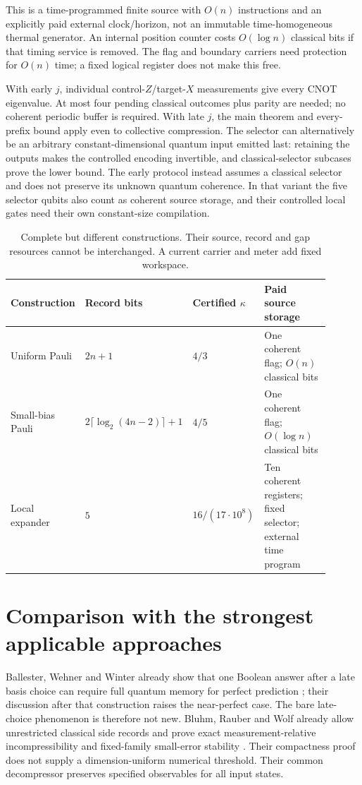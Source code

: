 \documentclass[11pt]{article}
\begin{document}
This is a time-programmed finite source with $O(n)$ instructions and an
explicitly paid external clock/horizon, not an immutable time-homogeneous
thermal generator. An internal position counter costs $O(\log n)$ classical
bits if that timing service is removed. The flag and boundary carriers need
protection for $O(n)$ time; a fixed logical register does not make this free.

With early $j$, individual control-$Z$/target-$X$ measurements give every
CNOT eigenvalue. At most four pending classical outcomes plus parity are
needed; no coherent periodic buffer is required. With late $j$, the main
theorem and every-prefix bound apply even to collective compression.
The selector can alternatively be an arbitrary constant-dimensional quantum
input emitted last: retaining the outputs makes the controlled encoding
invertible, and classical-selector subcases prove the lower bound. The early
protocol instead assumes a classical selector and does not preserve its
unknown quantum coherence.
In that variant the five selector qubits also count as coherent source storage,
and their controlled local gates need their own constant-size compilation.

\begin{table}[ht]
\centering\small
\begin{tabular}{@{}p{0.23\linewidth}p{0.22\linewidth}p{0.18\linewidth}p{0.27\linewidth}@{}}
\toprule
Construction & Record bits & Certified $\kappa$ & Paid source storage\\
\midrule
Uniform Pauli & $2n+1$ & $4/3$ & One coherent flag; $O(n)$ classical bits\\
Small-bias Pauli & $2\lceil\log_2(4n-2)\rceil+1$ & $4/5$ & One coherent flag; $O(\log n)$ classical bits\\
Local expander & $5$ & $16/(17\cdot10^8)$ & Ten coherent registers; fixed selector; external time program\\
\bottomrule
\end{tabular}
\caption{Complete but different constructions. Their source, record and gap
resources cannot be interchanged. A current carrier and meter add fixed workspace.}
\end{table}

\section{Comparison with the strongest applicable approaches}
Ballester, Wehner and Winter already show that one Boolean answer after a late
basis choice can require full quantum memory for perfect prediction
\cite[Theorem 6.6]{bww}; their discussion after that construction raises the
near-perfect case. The bare late-choice phenomenon is therefore not new.
Bluhm, Rauber and Wolf already allow unrestricted classical side records and
prove exact measurement-relative incompressibility and fixed-family small-error
stability \cite[Theorem 5.1]{brw}. Their compactness proof does not supply a
dimension-uniform numerical threshold. Their common decompressor preserves
specified observables for all input states.
\end{document}
